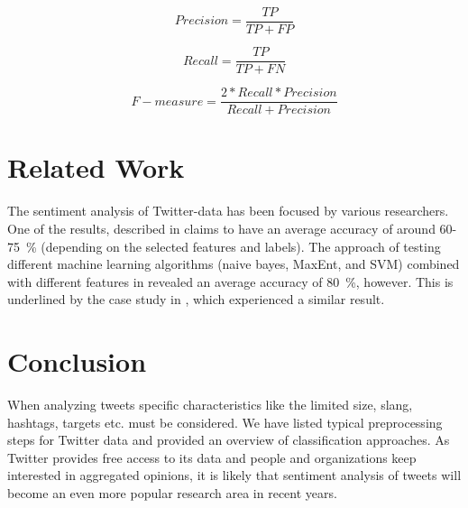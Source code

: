 \documentclass{acm_proc_article-sp}
\begin{document}
\begin{equation}
Precision = \frac{TP}{TP+FP}
\end{equation}

\begin{equation}
Recall = \frac{TP}{TP+FN}
\end{equation}

\begin{equation}
F-measure = \frac{2*Recall*Precision}{Recall+Precision}
\end{equation}


\section{Related Work} \label{related}
The sentiment analysis of Twitter-data has been focused by various researchers. One of the results, described in \cite{agarwal2011sentiment} claims to have an average accuracy of around 60-75~\% (depending on the selected features and labels). 
The approach of testing different machine learning algorithms (naive bayes, MaxEnt, and SVM) combined with different features in \cite{go2009twitter} revealed an average accuracy of 80~\%, however. This is underlined by the case study in \cite{lin2012large}, which experienced a similar result.

\section{Conclusion} \label{conclusion}
When analyzing tweets specific characteristics like the limited size, slang, hashtags, targets etc. must be considered. We have listed typical preprocessing steps for Twitter data and provided an overview of classification approaches. 
As Twitter provides free access to its data and people and organizations keep interested in aggregated opinions, it is likely that sentiment analysis of tweets will become an even more popular research area in recent years.



%

%
%
\end{document}
